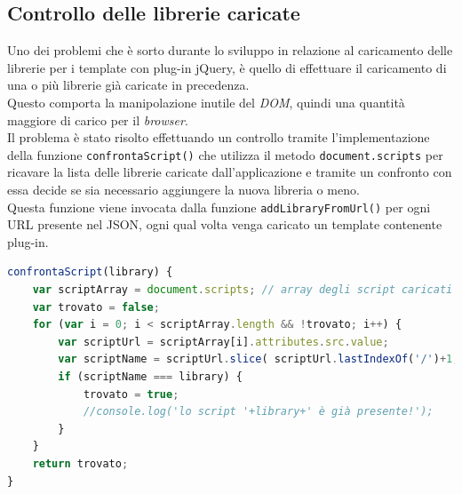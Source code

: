 \subsection{Controllo delle librerie caricate}
Uno dei problemi che è sorto durante lo sviluppo in relazione al caricamento delle librerie per i template con plug-in jQuery, è quello di effettuare il caricamento di una o più librerie già caricate in precedenza.\\
Questo comporta la manipolazione inutile del \textit{DOM}, quindi una quantità maggiore di carico per il \textit{browser}.\\
Il problema è stato risolto effettuando un controllo tramite l'implementazione della funzione \texttt{confrontaScript()} che utilizza il metodo \texttt{document.scripts} per ricavare la lista delle librerie caricate dall'applicazione e tramite un confronto con essa decide se sia necessario aggiungere la nuova libreria o meno.\\
Questa funzione viene invocata dalla funzione \texttt{addLibraryFromUrl()} per ogni URL presente nel JSON, ogni qual volta venga caricato un template contenente plug-in.
\begin{lstlisting}[language= JavaScript, caption= Funzione che gestisce il caricamento di una libreria.]
confrontaScript(library) {
	var scriptArray = document.scripts; // array degli script caricati
	var trovato = false;
	for (var i = 0; i < scriptArray.length && !trovato; i++) {
		var scriptUrl = scriptArray[i].attributes.src.value;
		var scriptName = scriptUrl.slice( scriptUrl.lastIndexOf('/')+1, scriptUrl.length);
		if (scriptName === library) {
			trovato = true;
			//console.log('lo script '+library+' è già presente!');
		}
	}
	return trovato;
}

\end{lstlisting}


